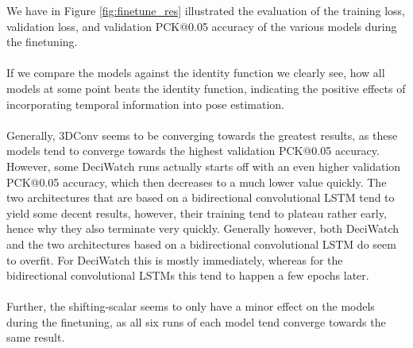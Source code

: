 \documentclass[./main.tex]{subfiles}
\begin{document}
We have in Figure \ref{fig:finetune_res} illustrated the evaluation of the training loss, validation loss, and validation PCK@0.05 accuracy of the various models during the finetuning.
\\
\\
If we compare the models against the identity function we clearly see, how all models at some point beats the identity function, indicating the positive effects of incorporating temporal information into pose estimation.
\\
\\
Generally, 3DConv seems to be converging towards the greatest results, as these models tend to converge towards the highest validation PCK@0.05 accuracy. However, some DeciWatch runs actually starts off with an even higher validation PCK@0.05 accuracy, which then decreases to a much lower value quickly. The two architectures that are based on a bidirectional convolutional LSTM tend to yield some decent results, however, their training tend to plateau rather early, hence why they also terminate very quickly. Generally however, both DeciWatch and the two architectures based on a bidirectional convolutional LSTM do seem to overfit. For DeciWatch this is mostly immediately, whereas for the bidirectional convolutional LSTMs this tend to happen a few epochs later.
\\
\\
Further, the shifting-scalar seems to only have a minor effect on the models during the finetuning, as all six runs of each model tend converge towards the same result.
\end{document}
